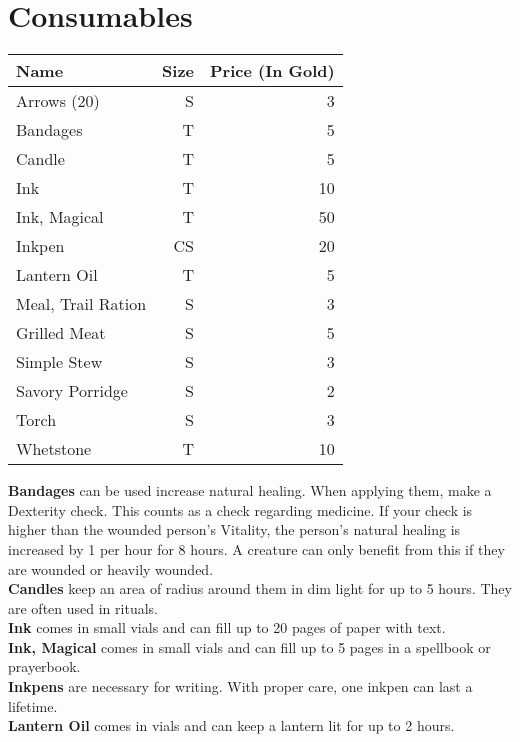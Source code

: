 \section{Consumables}\label{sec:consumables}
\begin{longtable}{l | r | r}
	Name & Size & Price (In Gold)\\ \hline
	Arrows (20) & S & 3\\
	Bandages & T & 5\\
	Candle & T & 5\\
	Ink & T & 10\\
	Ink, Magical & T & 50\\
	Inkpen & CS & 20\\
	Lantern Oil & T & 5\\
	Meal, Trail Ration & S & 3\\
	Grilled Meat & S & 5\\
	Simple Stew & S & 3\\
	Savory Porridge & S & 2\\
	Torch & S & 3\\
	Whetstone & T & 10\\
\end{longtable}


\textbf{Bandages} can be used increase natural healing.
When applying them, make a Dexterity check.
This counts as a check regarding medicine.
If your check is higher than the wounded person's Vitality, the person's natural healing is increased by 1 per hour for 8 hours.
A creature can only benefit from this if they are wounded or heavily wounded.\\

\textbf{Candles} keep an area of  radius around them in dim light for up to 5 hours.
They are often used in rituals.\\

\textbf{Ink} comes in small vials and can fill up to 20 pages of paper with text.\\

\textbf{Ink, Magical} comes in small vials and can fill up to 5 pages in a spellbook or prayerbook.\\

\textbf{Inkpens} are necessary for writing.
With proper care, one inkpen can last a lifetime.\\

\textbf{Lantern Oil} comes in vials and can keep a lantern lit for up to 2 hours.\\

